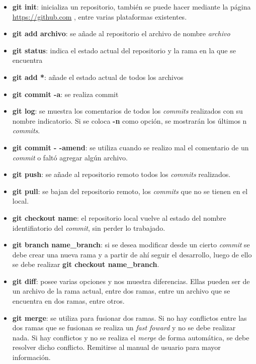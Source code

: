 \begin{itemize}
	\item \textbf{git init}: inicializa un repositorio, también se puede hacer mediante la página \url{https://github.com} , entre varias plataformas existentes.
	\item \textbf{git add archivo}: se añade al repositorio el archivo de nombre \textit{archivo}
	\item \textbf{git status}: indica el estado actual del repositorio y la rama en la que se encuentra
	\item \textbf{git add *}: añade el estado actual de todos los archivos
	\item \textbf{git commit -a}: se realiza commit
	\item \textbf{git log}: se muestra los comentarios de todos los \textit{commits} realizados con su nombre indicatorio. Si se coloca \textbf{-n} como opción, se mostrarán los últimos n \textit{commits}.
	\item \textbf{git commit - -amend}: se utiliza cuando se realizo mal el comentario de un \textit{commit} o faltó agregar algún archivo.
	\item \textbf{git push}: se añade al repositorio remoto todos los \textit{commits} realizados.
	\item \textbf{git pull}: se bajan del repositorio remoto, los \textit{commits} que no se tienen en el local.
	\item \textbf{git checkout name}: el repositorio local vuelve al estado del nombre identifiatorio del \textit{commit}, sin perder lo trabajado.
	\item \textbf{git branch name\_branch}: si se desea modificar desde un cierto \textit{commit} se debe crear una nueva rama y a partir de ahí seguir el desarrollo, luego de ello se debe realizar \textbf{git checkout name\_branch}.
	\item \textbf{git diff}: posee varias opciones y nos muestra diferencias. Ellas pueden ser de un archivo de la rama actual, entre dos ramas, entre un archivo que se encuentra en dos ramas, entre otros.
	\item \textbf{git merge}: se utiliza para fusionar dos ramas. Si no hay conflictos entre las dos ramas que se fusionan se realiza un \textit{fast foward} y no se debe realizar nada. Si hay conflictos y no se realiza el \textit{merge} de forma automática, se debe resolver dicho conflicto. Remitirse al manual de usuario para mayor información.
\end{itemize}

